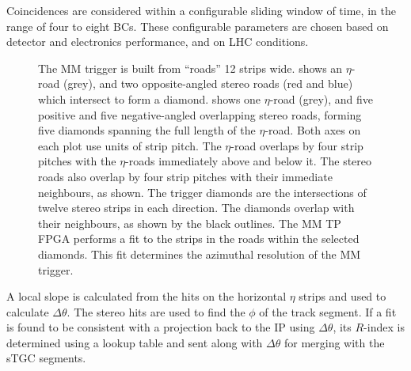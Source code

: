 \documentclass[cernpreprint, atlasdraft=false, UKenglish,british,orcidlogo, texmf, orcidlogo]{atlasdoc}
\begin{document}
Coincidences are considered within a configurable sliding window of time, in the range of four to eight \glspl{BC}. These configurable parameters are chosen based on detector and electronics performance, and on \gls{LHC} conditions.
\begin{figure}[!h]
\caption{The \gls{MM} trigger is built from ``roads'' \num{12} strips wide. \protect{} shows an $\eta$-road (grey), and two opposite-angled stereo roads (red and blue) which intersect to form a diamond.
\protect{} shows one $\eta$-road (grey), and five positive and five negative-angled overlapping stereo roads, forming five diamonds spanning the full length of the $\eta$-road. Both axes on each plot use units of strip pitch.
The $\eta$-road overlaps by four strip pitches with the $\eta$-roads immediately above and below it. The stereo roads also overlap by four strip pitches with their immediate neighbours, as shown.
The trigger diamonds are the intersections of twelve stereo strips in each direction. The diamonds overlap with their neighbours, as shown by the black outlines.
The \gls{MM} \gls{TP} \gls{FPGA} performs a fit to the strips in the roads within the selected diamonds. This fit determines the azimuthal resolution of the \gls{MM} trigger.}
\end{figure}
 
A local slope is calculated from the hits on the horizontal $\eta$ strips and used to calculate $\Delta\theta$. The stereo hits are used to find the $\phi$ of the track segment. If a fit is found to be consistent with a projection back to the \gls{IP} using $\Delta\theta$, its $R$-index is determined using a lookup table and sent along with  $\Delta\theta$ for merging with the \gls{sTGC} segments.
 
\end{document}
